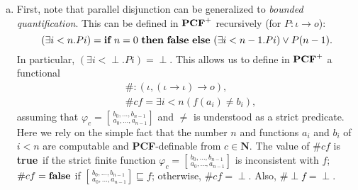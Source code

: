 \documentclass[fleqn]{LMCS}
\theoremstyle{plain}\newtheorem{satz}[thm]{Satz}
\theoremstyle{plain}\newtheorem{hyp}[thm]{Hypothesis}
\theoremstyle{plain}\newtheorem{hyps}[thm]{Hypotheses}
\theoremstyle{definition}\newtheorem{note}[thm]{Note}
\newcommand{\arr}{\rightarrow}
\newcommand{\NN}{\mathbf{N}}
\newcommand{\PCF}{\mbox{\bf PCF}}
\newcommand{\IF}{\mbox{\bf if}}
\newcommand{\THEN}{\mbox{\bf then}}
\newcommand{\ELSE}{\mbox{\bf else}}
\newcommand{\Undef}{{\perp}}
\newcommand{\?}{\mbox{?}}
\newcommand{\false}{\mbox{\bf false}}
\newcommand{\true}{\mbox{\bf true}}
\begin{document}
\proof\hfill  \begin{enumerate}[(a)]
\item First, note that parallel disjunction can be generalized 
to \emph{bounded quantification}. This can be defined in $\PCF^+$ 
recursively (for $P:\iota\arr o$): 
\[
(\exists i<n.Pi) = 
\IF\ n=0\ \THEN\ \false\ \ELSE\ (\exists i<n-1.Pi)\vee P(n-1).
\]
In particular, $(\exists i<\Undef.Pi)=\Undef$. 
This allows us to define in $\PCF^+$ a functional 
\begin{align*}
&\#:(\iota,(\iota\arr\iota)\arr o),  
\\
&\#c f
	=
	\exists i<n(f(a_i)\ne b_i), 
\end{align*}
assuming that 
$\varphi_c=
		 \left[\,^{b_0,\ldots,b_{n-1}}
		 _{a_0,\ldots,a_{n-1}}\right]
$ and 
$\ne$ is understood as a strict predicate. 
Here we rely on the simple fact that the number $n$ and functions 
$a_i$ and $b_i$ of $i<n$ are computable and \PCF-definable from $c\in\NN$. 
The value of $\#c f$ is \true\ if the strict finite function 
$	
	\varphi_c =
		 \left[\,^{b_0,\ldots,b_{n-1}}
		 _{a_0,\ldots,a_{n-1}}\right]
$
is inconsistent with $f$; $\#c f=\false$ if  
$	\left[\,^{b_0,\ldots,b_{n-1}}
		 _{a_0,\ldots,a_{n-1}}\right]
\sqsubseteq f
$; 
otherwise, $\#c f=\Undef$. Also, $\#\Undef f=\Undef$. 







\end{enumerate}
\end{document}
